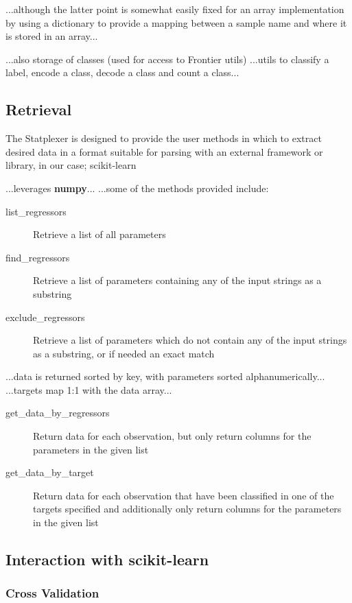...although the latter point is somewhat easily fixed for an array
implementation by using a dictionary to provide a mapping between a sample name
and where it is stored in an array...

...also storage of classes (used for access to Frontier utils)
...utils to classify a label, encode a class, decode a class and count a
class...


\subsection{Retrieval}
The Statplexer is designed to provide the user methods in which to extract
desired data in a format suitable for parsing with an external framework or
library, in our case; scikit-learn

...leverages \textbf{numpy}...
...some of the methods provided include:

\begin{description}
    \item[list\_regressors] Retrieve a list of all parameters
    \item[find\_regressors] Retrieve a list of parameters containing any of the
        input strings as a substring
    \item[exclude\_regressors] Retrieve a list of parameters which do not
        contain any of the input strings as a substring, or if needed an exact
        match
\end{description}

...data is returned sorted by key, with parameters sorted alphanumerically...
...targets map 1:1 with the data array...

\begin{description}
    \item[get\_data\_by\_regressors] Return data for each observation, but only
        return columns for the parameters in the given list
    \item[get\_data\_by\_target] Return data for each observation that have been
        classified in one of the targets specified and additionally only
        return columns for the parameters in the given list
\end{description}

\subsection{Interaction with scikit-learn}
\subsubsection{Cross Validation}

